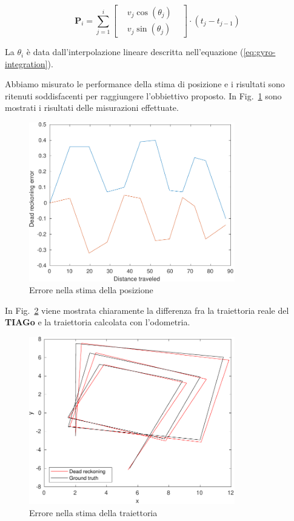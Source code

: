 \documentclass[a4paper]{article}
\begin{document}
	\begin{equation}\label{eq:position-vector-update}
		\textbf{P}_i = \sum_{j = 1}^{i} \begin{bmatrix}
			 & v_j\cos(\theta_j ) & \\
			 & v_j\sin(\theta_j )
		\end{bmatrix}\cdot (t_j-t_{j-1}) 
	\end{equation}

	La $\theta_i$ è data dall'interpolazione lineare descritta nell'equazione (\ref{eq:gyro-integration}).
	
	Abbiamo misurato le performance della stima di posizione e i risultati sono ritenuti soddisfacenti per raggiungere l'obbiettivo proposto. In Fig.~\ref{fig:dead_reckoning_error} sono mostrati i risultati delle misurazioni effettuate.
	
	\begin{figure}[H]
		\centering
		\includegraphics[width=0.8\textwidth]{./img/dead_reckoning_error.pdf}
		\caption{Errore nella stima della posizione}
		\label{fig:dead_reckoning_error}
	\end{figure}

	In Fig.~\ref{fig:trajectory_error} viene mostrata chiaramente la differenza fra la traiettoria reale del \textbf{TIAGo} e la traiettoria calcolata con l'odometria.
	
	\begin{figure}[H]
		\centering
		\includegraphics[width=0.8\textwidth]{./img/trajectories.pdf}
		\caption{Errore nella stima della traiettoria}
		\label{fig:trajectory_error}
	\end{figure}
	
\end{document}
